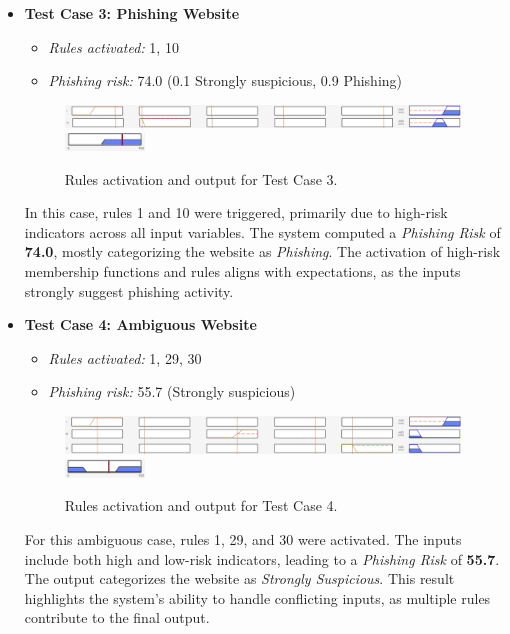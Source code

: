 \documentclass{article}
\begin{document}
\begin{itemize}
    \item \textbf{Test Case 3: Phishing Website}
    \begin{itemize}
        \item \textit{Rules activated:} 1, 10
        \item \textit{Phishing risk:} 74.0 (0.1 Strongly suspicious, 0.9 Phishing)
    \end{itemize}    
    \begin{figure}[H]
        \centering
        \includegraphics[width=0.99\textwidth]{figures/Activations_Test3.png}
        \\
        \hfill
        \includegraphics[width=0.20\textwidth]{figures/Output_Test3(74).png}
        \caption{Rules activation and output for Test Case 3.}
        \label{fig:test3}
    \end{figure}
    In this case, rules 1 and 10 were triggered, primarily due to high-risk indicators across all input variables. The system computed a \textit{Phishing Risk} of \textbf{74.0}, mostly categorizing the website as \textit{Phishing}. The activation of high-risk membership functions and rules aligns with expectations, as the inputs strongly suggest phishing activity.  

    \item \textbf{Test Case 4: Ambiguous Website}
    \begin{itemize}
        \item \textit{Rules activated:} 1, 29, 30
        \item \textit{Phishing risk:} 55.7 (Strongly suspicious)
    \end{itemize}    
    \begin{figure}[H]
        \centering
        \includegraphics[width=0.99\textwidth]{figures/Activations_Test4.png}
        \\
        \hfill
        \includegraphics[width=0.20\textwidth]{figures/Output_Test4(55-7).png}
        \caption{Rules activation and output for Test Case 4.}
        \label{fig:test4}
    \end{figure}
    For this ambiguous case, rules 1, 29, and 30 were activated. The inputs include both high and low-risk indicators, leading to a \textit{Phishing Risk} of \textbf{55.7}. The output categorizes the website as \textit{Strongly Suspicious}. This result highlights the system's ability to handle conflicting inputs, as multiple rules contribute to the final output.
    
\end{itemize}
\end{document}
